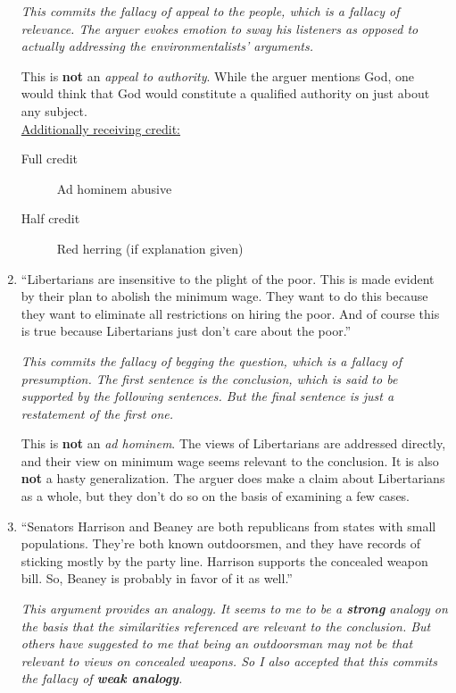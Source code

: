 \documentclass[10pt]{article}
\begin{document}
\begin{enumerate}
\textit{This commits the fallacy of appeal to the people, which is a fallacy of relevance.  The arguer evokes emotion to sway his listeners as opposed to actually addressing the environmentalists' arguments.}

  This is \textbf{not} an \textit{appeal to authority}.  While the arguer mentions God, one would think that God would constitute a qualified authority on just about any subject.
  \\
  
  \underline{Additionally receiving credit:} 
 \begin{description}
  \item [Full credit] Ad hominem abusive
  \item [Half credit] Red herring (if explanation given)
 \end{description}
  
  \item ``Libertarians are insensitive to the plight of the poor. This is made evident by their plan to abolish the minimum wage. They want to do this because they want to eliminate all restrictions on hiring the poor. And of course this is true because Libertarians just don't care about the poor.''
  
  \textit{This commits the fallacy of begging the question, which is a fallacy of presumption.  The first sentence is the conclusion, which is said to be supported by the following sentences.  But the final sentence is just a restatement of the first one.}
  
  This is \textbf{not} an \textit{ad hominem}.  The views of Libertarians are addressed directly, and their view on minimum wage seems relevant to the conclusion.  It is also \textbf{not} a hasty generalization.  The arguer does make a claim about Libertarians as a whole, but they don't do so on the basis of examining a few cases.
  
  \item ``Senators Harrison and Beaney are both republicans from states with small populations.  They're both known outdoorsmen, and they have records of sticking mostly by the party line.  Harrison supports the concealed weapon bill.  So, Beaney is probably in favor of it as well.''

\textit{This argument provides an analogy.  It seems to me to be a \textbf{strong} analogy on the basis that the similarities referenced are relevant to the conclusion.  But others have suggested to me that being an outdoorsman may not be that relevant to views on concealed weapons.  So I also accepted that this commits the fallacy of \textbf{weak analogy}.}
  

\end{enumerate}
\end{document}
